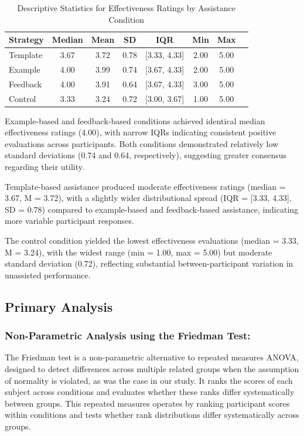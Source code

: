 \begin{table}[h]
\centering
\begin{tabular}{lccccccc}
\hline
\textbf{Strategy} & \textbf{Median} & \textbf{Mean} & \textbf{SD} & \textbf{IQR} & \textbf{Min} & \textbf{Max} \\
\hline
Template & 3.67 & 3.72 & 0.78 & [3.33, 4.33] & 2.00 & 5.00 \\
Example & 4.00 & 3.99 & 0.74 & [3.67, 4.33] & 2.00 & 5.00 \\
Feedback & 4.00 & 3.91 & 0.64 & [3.67, 4.33] & 3.00 & 5.00 \\
Control & 3.33 & 3.24 & 0.72 & [3.00, 3.67] & 1.00 & 5.00 \\
\hline
\end{tabular}
\caption{Descriptive Statistics for Effectiveness Ratings by Assistance Condition}
\label{tab:descriptive_stats}
\end{table}

Example-based and feedback-based conditions achieved identical median effectiveness ratings (4.00), with narrow IQRs indicating consistent positive evaluations across participants. Both conditions demonstrated relatively low standard deviations (0.74 and 0.64, respectively), suggesting greater consensus regarding their utility.

Template-based assistance produced moderate effectiveness ratings (median = 3.67, M = 3.72), with a slightly wider distributional spread (IQR = [3.33, 4.33], SD = 0.78) compared to example-based and feedback-based assistance, indicating more variable participant responses.

The control condition yielded the lowest effectiveness evaluations (median = 3.33, M = 3.24), with the widest range (min = 1.00, max = 5.00) but moderate standard deviation (0.72), reflecting substantial between-participant variation in unassisted performance.

\subsection{\textbf{Primary Analysis}}

\subsubsection{Non-Parametric Analysis using the Friedman Test:}

The Friedman test is a non-parametric alternative to repeated measures ANOVA, designed to detect differences across multiple related groups when the assumption of normality is violated, as was the case in our study. It ranks the scores of each subject across conditions and evaluates whether these ranks differ systematically between groups. This repeated measures operates by ranking participant scores within conditions and tests whether rank distributions differ systematically across groups.


